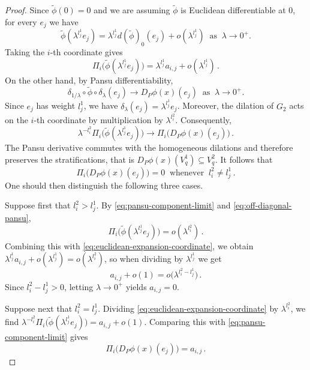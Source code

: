 \documentclass[10pt,a4paper]{amsart}
\begin{document}
\begin{proof}
Since $\widetilde\phi(0)=0$ and we are assuming \(\widetilde\phi\) is Euclidean differentiable at \(0\), for every
\(e_j\) we have
\[
\widetilde\phi(\lambda^{l_j^1}e_j)
=
\lambda^{l_j^1}d(\widetilde\phi)_0(e_j)
+
o(\lambda^{l_j^1})
\ \text{ as }\ \lambda\to0^+.
\]
Taking the \(i\)-th coordinate gives
\begin{equation}
\label{eq:euclidean-expansion-coordinate}
\Pi_i\bigl(\widetilde\phi(\lambda^{l_j^1}e_j)\bigr)
=
\lambda^{l_j^1}a_{i,j}
+
o(\lambda^{l_j^1})\,.
\end{equation}
On the other hand, by Pansu differentiability,
\[
\delta_{1/\lambda}\circ\widetilde\phi\circ\delta_\lambda(e_j)
\longrightarrow
D_P\phi(x)(e_j)\ 
\text{ as }\ \lambda\to0^+.
\]
Since \(e_j\) has weight \(l_j^1\), we have $\delta_\lambda(e_j)=\lambda^{l_j^1}e_j$.
Moreover, the dilation of \(G_2\) acts on the \(i\)-th coordinate by
multiplication by \(\lambda^{l_i^2}\). Consequently,
\begin{equation}
\label{eq:pansu-component-limit}
\lambda^{-l_i^2}
\Pi_i\bigl(\widetilde\phi(\lambda^{l_j^1}e_j)\bigr)
\longrightarrow
\Pi_i\bigl(D_P\phi(x)(e_j)\bigr)\,.
\end{equation}
The Pansu derivative commutes with the homogeneous dilations and
therefore preserves the stratifications, that is $D_P\phi(x)(V_q^1)\subseteq V_q^2$.
It follows that
\begin{equation}
\label{eq:off-diagonal-pansu}
\Pi_i\bigl(D_P\phi(x)(e_j)\bigr)=0
\ \text{ whenever }\ 
l_i^2\neq l_j^1\,.
\end{equation}
One should then distinguish the following three cases.

Suppose first that \(l_i^2>l_j^1\). By
\eqref{eq:pansu-component-limit} and
\eqref{eq:off-diagonal-pansu},
\[
\Pi_i\bigl(\widetilde\phi(\lambda^{l_j^1}e_j)\bigr)
=
o(\lambda^{l_i^2})\,.
\]
Combining this with
\eqref{eq:euclidean-expansion-coordinate}, we obtain $\lambda^{l_j^1}a_{i,j}+o(\lambda^{l_j^1})
=
o(\lambda^{l_i^2})$, so when
dividing by \(\lambda^{l_j^1}\) we get
\[
a_{i,j}+o(1)
=
o\bigl(\lambda^{l_i^2-l_j^1}\bigr)\,.
\]
Since \(l_i^2-l_j^1>0\), letting \(\lambda\to0^+\) yields $a_{i,j}=0$.

Suppose next that \(l_i^2=l_j^1\). Dividing
\eqref{eq:euclidean-expansion-coordinate} by \(\lambda^{l_i^2}\), we find $
\lambda^{-l_i^2}
\Pi_i\bigl(\widetilde\phi(\lambda^{l_j^1}e_j)\bigr)
=
a_{i,j}+o(1)$.
Comparing this with \eqref{eq:pansu-component-limit} gives
\[
\Pi_i\bigl(D_P\phi(x)(e_j)\bigr)=a_{i,j}\,.
\]


\end{proof}
\end{document}
